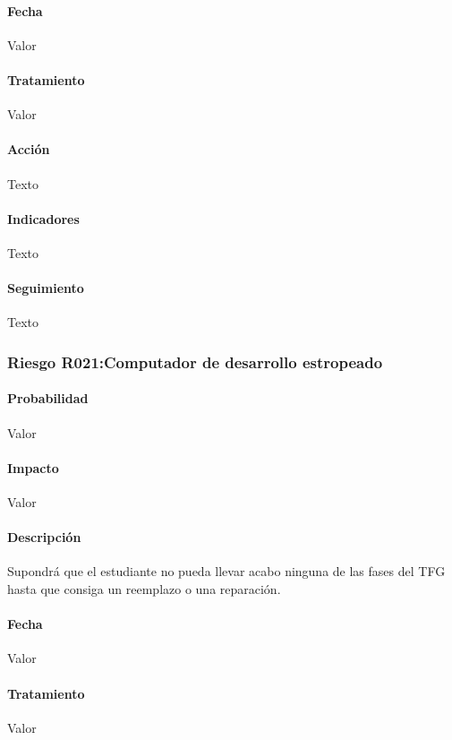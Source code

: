 \documentclass[10pt,a4paper]{article}
\begin{document}
				\paragraph{Fecha} Valor %
				\paragraph{Tratamiento} Valor %
				\paragraph{Acción} Texto %
				\paragraph{Indicadores} Texto %
				\paragraph{Seguimiento}	Texto %
				
				\subsubsection{Riesgo R021:Computador de desarrollo estropeado }
				\paragraph{Probabilidad} Valor
				\paragraph{Impacto}	Valor
				\paragraph{Descripción} Supondrá que el estudiante no pueda llevar acabo ninguna de las fases del TFG hasta que consiga un reemplazo o una reparación.
				\paragraph{Fecha} Valor %
				\paragraph{Tratamiento} Valor %
\end{document}
